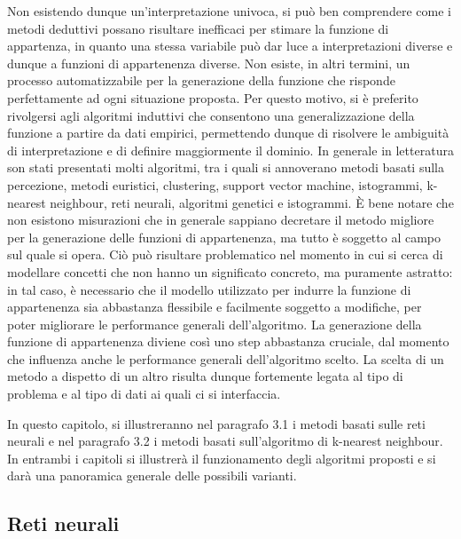 \documentclass[11pt]{article}
\begin{document}
Non esistendo dunque un'interpretazione univoca, si può ben comprendere come i metodi deduttivi possano risultare inefficaci per stimare la funzione di appartenza, in quanto una stessa variabile può dar luce a interpretazioni diverse e dunque a funzioni di appartenenza diverse. Non esiste, in altri termini, un processo automatizzabile per la generazione della funzione che risponde perfettamente ad ogni situazione proposta. Per questo motivo, si è preferito rivolgersi agli algoritmi induttivi che consentono una generalizzazione della funzione a partire da dati empirici, permettendo dunque di risolvere le ambiguità di interpretazione e di definire maggiormente il dominio. In generale in letteratura son stati presentati molti algoritmi, tra i quali si annoverano metodi basati sulla percezione, metodi euristici, clustering, support vector machine, istogrammi, k-nearest neighbour, reti neurali, algoritmi genetici e istogrammi. 
\`E bene notare che non esistono misurazioni che in generale sappiano decretare il metodo migliore per la generazione delle funzioni di appartenenza, ma tutto è soggetto al campo sul quale si opera. Ciò può risultare problematico nel momento in cui si cerca di modellare concetti che non hanno un significato concreto, ma puramente astratto: in tal caso, è necessario che il modello utilizzato per indurre la funzione di appartenenza sia abbastanza flessibile e facilmente soggetto a modifiche, per poter migliorare le performance generali dell'algoritmo. La generazione della funzione di appartenenza diviene così uno step abbastanza cruciale, dal momento che influenza anche le performance generali dell'algoritmo scelto. La scelta di un metodo a dispetto di un altro risulta dunque fortemente legata al tipo di problema e al tipo di dati ai quali ci si interfaccia. 

In questo capitolo, si illustreranno nel paragrafo 3.1 i metodi basati sulle reti neurali e nel paragrafo 3.2 i metodi basati sull'algoritmo di k-nearest neighbour. In entrambi i capitoli si illustrerà il funzionamento degli algoritmi proposti e si darà una panoramica generale delle possibili varianti. 

\newpage

	\subsection{Reti neurali}
\end{document}
